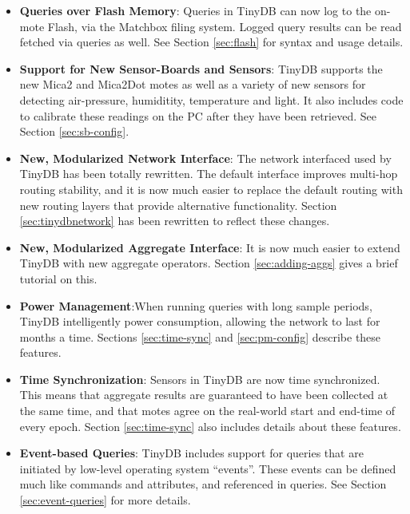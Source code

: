 \documentclass[11pt]{article}
\begin{document}
\begin{itemize}
  
\item {\bf Queries over Flash Memory}: Queries in TinyDB can now log
  to the on-mote Flash, via the Matchbox filing system.  Logged query
  results can be read fetched via queries as well.  See Section
  \ref{sec:flash} for syntax and usage details.
  
\item {\bf Support for New Sensor-Boards and Sensors}: TinyDB supports
  the new Mica2 and Mica2Dot motes as well as a variety of new sensors
  for detecting air-pressure, humiditity, temperature and light.  It
  also includes code to calibrate these readings on the PC after they
  have been retrieved.  See Section \ref{sec:sb-config}.
  
\item {\bf New, Modularized Network Interface}: The network interfaced
  used by TinyDB has been totally rewritten.  The default interface
  improves multi-hop routing stability, and it is now much easier to
  replace the default routing with new routing layers that provide
  alternative functionality.  Section \ref{sec:tinydbnetwork} has been
  rewritten to reflect these changes.
  
\item {\bf New, Modularized Aggregate Interface}: It is now much
  easier to extend TinyDB with new aggregate operators. Section
  \ref{sec:adding-aggs} gives a brief tutorial on this.
  
\item {\bf Power Management}:When running queries with long sample
  periods, TinyDB intelligently power consumption, allowing the
  network to last for months a time.  Sections \ref{sec:time-sync} and
  \ref{sec:pm-config} describe these features.
  
\item {\bf Time Synchronization}: Sensors in TinyDB are now time
  synchronized.  This means that aggregate results are guaranteed to
  have been collected at the same time, and that motes agree on the
  real-world start and end-time of every epoch. Section
  \ref{sec:time-sync} also includes details about these features.
  
\item {\bf Event-based Queries}: TinyDB includes support for queries
  that are initiated by low-level operating system ``events''.  These
  events can be defined much like commands and attributes, and
  referenced in queries.  See Section \ref{sec:event-queries} for more
  details.
  

\end{itemize}
\end{document}

